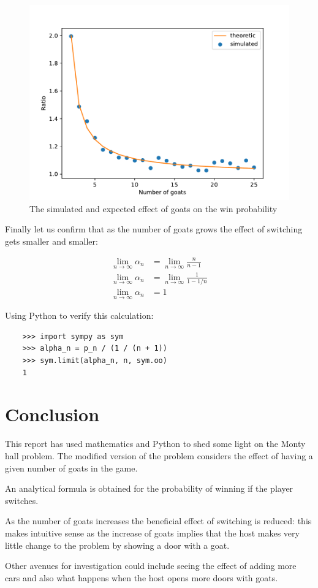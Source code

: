 \documentclass[a4paper]{article}
\begin{document}
\begin{figure}[!htbp]
    \begin{center}
        \includegraphics[width=.6\textwidth]{./simulated_v_expected_ratio_of_win_probability.pdf}
    \end{center}
    \caption{The simulated and expected effect of goats on the win probability}
    \label{fig:simulated_v_expected_ratio_of_win_probability}
\end{figure}

Finally let us confirm that as the number of goats grows the effect of switching
gets smaller and smaller:

\begin{multicols}{2}

    \begin{align}
        \lim_{n\to\infty}\alpha_n & = \lim_{n\to\infty}\frac{n}{n - 1}\\
        \lim_{n\to\infty}\alpha_n & = \lim_{n\to\infty}\frac{1}{1 - 1 / n}\\
        \lim_{n\to\infty}\alpha_n & = 1
    \end{align}

    \columnbreak

Using Python to verify this calculation:

    \begin{verbatim}
    >>> import sympy as sym
    >>> alpha_n = p_n / (1 / (n + 1))
    >>> sym.limit(alpha_n, n, sym.oo)
    1
    \end{verbatim}

\end{multicols}

\section{Conclusion}

This report has used mathematics and Python to shed some light on the Monty hall
problem. The modified version of the problem considers the effect of having a
given number of goats in the game.

An analytical formula is obtained for the probability of winning if the player
switches.

As the number of goats increases the beneficial effect of switching is reduced:
this makes intuitive sense as the increase of goats implies that the host makes
very little change to the problem by showing a door with a goat.

Other avenues for investigation could include seeing the effect of adding more
cars and also what happens when the host opens more doors with goats.



\end{document}
